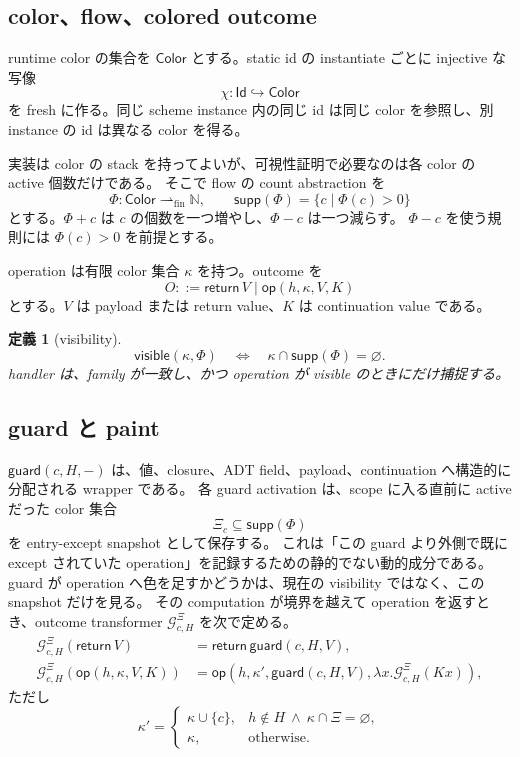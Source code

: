 \documentclass[uplatex,dvipdfmx,a4paper,10.5pt]{jsarticle}
\theoremstyle{jpplain}
\newtheorem{definition}{定義}[section]
\newcommand{\Id}{\mathsf{Id}}
\newcommand{\Nat}{\mathbb N}
\newcommand{\Color}{\mathsf{Color}}
\newcommand{\supp}{\mathsf{supp}}
\newcommand{\visible}{\mathsf{visible}}
\newcommand{\guard}{\mathsf{guard}}
\newcommand{\ret}{\mathsf{return}\,}
\newcommand{\oper}{\mathsf{op}}
\newcommand{\Guard}{\mathcal G}
\begin{document}
\subsection{color、flow、colored outcome}

runtime color の集合を $\Color$ とする。static id の instantiate ごとに injective な写像
\[
  \chi:\Id\hookrightarrow\Color
\]
を fresh に作る。同じ scheme instance 内の同じ id は同じ color を参照し、別 instance の id は異なる color を得る。

実装は color の stack を持ってよいが、可視性証明で必要なのは各 color の active 個数だけである。
そこで flow の count abstraction を
\[
  \Phi:\Color\rightharpoonup_{\mathrm{fin}}\Nat,
  \qquad
  \supp(\Phi)=\{c\mid\Phi(c)>0\}
\]
とする。$\Phi+c$ は $c$ の個数を一つ増やし、$\Phi-c$ は一つ減らす。
$\Phi-c$ を使う規則には $\Phi(c)>0$ を前提とする。

operation は有限 color 集合 $\kappa$ を持つ。outcome を
\[
  O ::= \ret V \mid \oper(h,\kappa,V,K)
\]
とする。$V$ は payload または return value、$K$ は continuation value である。

\begin{definition}[visibility]
\[
  \visible(\kappa,\Phi)
  \quad\Longleftrightarrow\quad
  \kappa\cap\supp(\Phi)=\varnothing.
\]
handler は、family が一致し、かつ operation が visible のときにだけ捕捉する。
\end{definition}

\subsection{guard と paint}

$\guard(c,H,-)$ は、値、closure、ADT field、payload、continuation へ構造的に分配される wrapper である。
各 guard activation は、scope に入る直前に active だった color 集合
\[
  \Xi_c\subseteq\supp(\Phi)
\]
を entry-except snapshot として保存する。
これは「この guard より外側で既に except されていた operation」を記録するための静的でない動的成分である。
guard が operation へ色を足すかどうかは、現在の visibility ではなく、この snapshot だけを見る。
その computation が境界を越えて operation を返すとき、outcome transformer
$\Guard^{\Xi}_{c,H}$ を次で定める。
\[
\begin{aligned}
 \Guard^{\Xi}_{c,H}(\ret V)
   &=\ret\guard(c,H,V),\\
 \Guard^{\Xi}_{c,H}(\oper(h,\kappa,V,K))
   &=\oper(h,\kappa',\guard(c,H,V),
      \lambda x.\Guard^{\Xi}_{c,H}(Kx)),
\end{aligned}
\]
ただし
\[
 \kappa'=
 \begin{cases}
   \kappa\cup\{c\},
     & h\notin H\ \land\ \kappa\cap\Xi=\varnothing,\\
   \kappa,&\text{otherwise}.
 \end{cases}
\]
\end{document}
